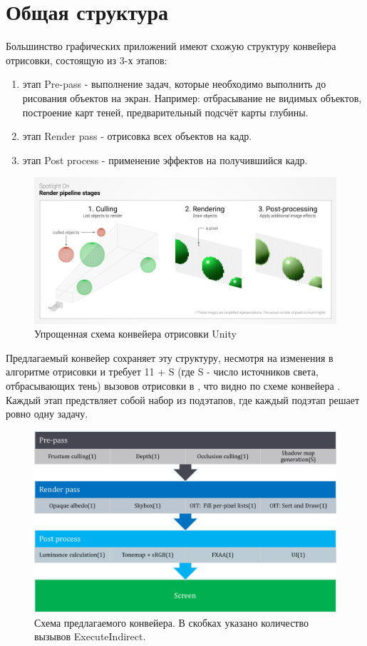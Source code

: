 \section{Общая структура} \label{ch3:pipeline_struct}
	Большинство графических приложений имеют схожую структуру конвейера отрисовки, состоящую из 3-х этапов:
	\begin{enumerate}[1.] 
		\item этап Pre-pass - выполнение задач, которые необходимо выполнить до рисования объектов на экран. Например: отбрасывание не видимых объектов, построение карт теней, предварительный подсчёт карты глубины.
		\item этап Render pass - отрисовка всех объектов на кадр.
		\item этап Post process - применение эффектов на получившийся кадр.
	\end{enumerate}
		
	\begin{figure}[ht!] 
		\center
		\includegraphics [scale=0.35] {my_folder/images//unity_pipeline}	
		\caption{Упрощенная схема конвейера отрисовки Unity} 
		\label{fig:unity_pipeline}  
	\end{figure}

	Предлагаемый конвейер сохраняет эту структуру, несмотря на изменения в алгоритме отрисовки и требует 11 + S (где S - число источников света, отбрасывающих тень) вызовов отрисовки в , что видно по схеме конвейера . Каждый этап предствляет собой набор из подэтапов, где каждый подэтап решает ровно одну задачу.
	
	\begin{figure}[ht!] 
		\center
		\includegraphics [scale=0.4] {my_folder/images//pipeline_schema}	
		\caption{Схема предлагаемого конвейера. В скобках указано количество вызывов ExecuteIndirect.} 
		\label{fig:pipeline_schema}  
	\end{figure}
	
	\FloatBarrier